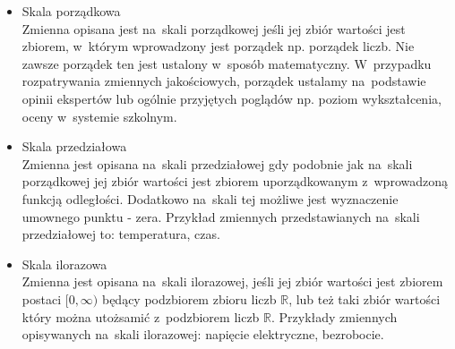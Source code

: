 \documentclass[12pt,a4paper]{report}
\begin{document}
\begin{itemize}


\item Skala porządkowa \cite[Rozdział 1.2]{panek2013}\\
Zmienna opisana jest na~skali porządkowej jeśli jej zbiór wartości jest zbiorem, w~którym wprowadzony jest porządek np. porządek liczb. Nie zawsze porządek ten jest ustalony w~sposób matematyczny. W~przypadku rozpatrywania zmiennych jakościowych, porządek ustalamy na~podstawie opinii ekspertów lub ogólnie przyjętych poglądów np. poziom wykształcenia, oceny w~systemie szkolnym. 


\item Skala przedziałowa \cite[Rozdział 1.2]{panek2013}\\
Zmienna jest opisana na~skali przedziałowej gdy podobnie jak na~skali porządkowej jej zbiór wartości jest zbiorem uporządkowanym z~wprowadzoną funkcją odległości. Dodatkowo na~skali tej możliwe jest wyznaczenie umownego punktu - zera. Przykład zmiennych przedstawianych na~skali przedziałowej to: temperatura, czas.


\item Skala ilorazowa \cite[Rozdział 1.2]{panek2013}\\
Zmienna jest opisana na~skali ilorazowej, jeśli jej zbiór wartości jest zbiorem postaci $[0, \infty)$ będący podzbiorem zbioru liczb $\mathbb{R}$, lub też taki zbiór wartości który można utożsamić z~podzbiorem liczb $\mathbb{R}$. Przykłady zmiennych opisywanych na~skali ilorazowej: napięcie elektryczne, bezrobocie. 


\end{itemize}
\end{document}
